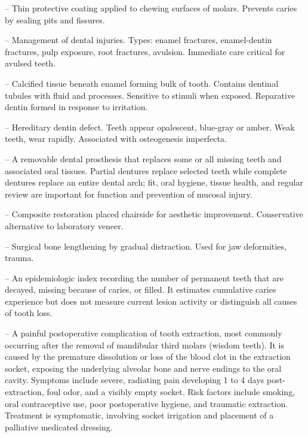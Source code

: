 -- Thin protective coating applied to chewing surfaces of molars. Prevents caries by sealing pits and fissures.

-- Management of dental injuries. Types: enamel fractures, enamel-dentin fractures, pulp exposure, root fractures, avulsion. Immediate care critical for avulsed teeth.

-- Calcified tissue beneath enamel forming bulk of tooth. Contains dentinal tubules with fluid and processes. Sensitive to stimuli when exposed. Reparative dentin formed in response to irritation.

-- Hereditary dentin defect. Teeth appear opalescent, blue-gray or amber. Weak teeth, wear rapidly. Associated with osteogenesis imperfecta.

-- A removable dental prosthesis that replaces some or all missing teeth and associated oral tissues. Partial dentures replace selected teeth while complete dentures replace an entire dental arch; fit, oral hygiene, tissue health, and regular review are important for function and prevention of mucosal injury.

-- Composite restoration placed chairside for aesthetic improvement. Conservative alternative to laboratory veneer.

-- Surgical bone lengthening by gradual distraction. Used for jaw deformities, trauma.

-- An epidemiologic index recording the number of permanent teeth that are decayed, missing because of caries, or filled. It estimates cumulative caries experience but does not measure current lesion activity or distinguish all causes of tooth loss.

-- A painful postoperative complication of tooth extraction, most commonly occurring after the removal of mandibular third molars (wisdom teeth). It is caused by the premature dissolution or loss of the blood clot in the extraction socket, exposing the underlying alveolar bone and nerve endings to the oral cavity. Symptoms include severe, radiating pain developing 1 to 4 days post-extraction, foul odor, and a visibly empty socket. Risk factors include smoking, oral contraceptive use, poor postoperative hygiene, and traumatic extraction. Treatment is symptomatic, involving socket irrigation and placement of a palliative medicated dressing.


